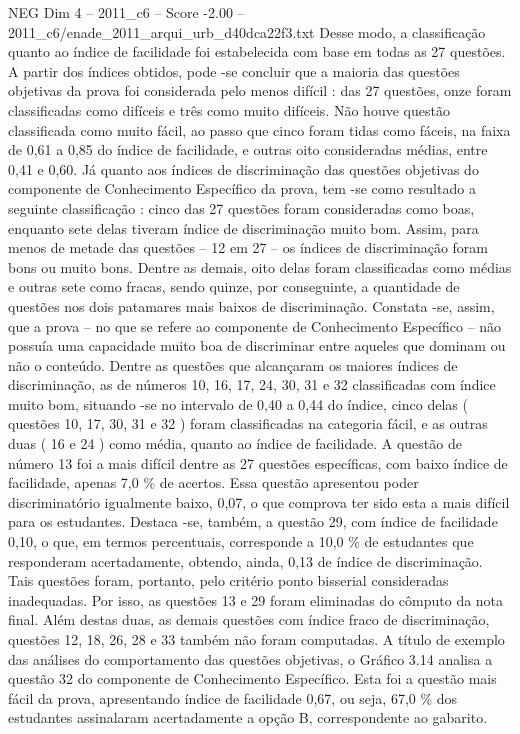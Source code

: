 \begin{textsample}{NEG Dim 4 – 2011\_c6 – Score -2.00 – 2011\_c6/enade\_2011\_arqui\_urb\_d40dca22f3.txt}
Desse modo, a classificação quanto ao índice de facilidade foi estabelecida com base em todas as 27 questões.
A partir dos índices obtidos, pode -se concluir que a maioria das questões objetivas da prova foi considerada pelo menos difícil : das 27 questões, onze foram classificadas como difíceis e três como muito difíceis.
Não houve questão classificada como muito fácil, ao passo que cinco foram tidas como fáceis, na faixa de 0,61 a 0,85 do índice de facilidade, e outras oito consideradas médias, entre 0,41 e 0,60.
Já quanto aos índices de discriminação das questões objetivas do componente de Conhecimento Específico da prova, tem -se como resultado a seguinte classificação : cinco das 27 questões foram consideradas como boas, enquanto sete delas tiveram índice de discriminação muito bom.
Assim, para menos de metade das questões – 12 em 27 – os índices de discriminação foram bons ou muito bons.
Dentre as demais, oito delas foram classificadas como médias e outras sete como fracas, sendo quinze, por conseguinte, a quantidade de questões nos dois patamares mais baixos de discriminação.
Constata -se, assim, que a prova – no que se refere ao componente de Conhecimento Específico – não possuía uma capacidade muito boa de discriminar entre aqueles que dominam ou não o conteúdo.
Dentre as questões que alcançaram os maiores índices de discriminação, as de números 10, 16, 17, 24, 30, 31 e 32 classificadas com índice muito bom, situando -se no intervalo de 0,40 a 0,44 do índice, cinco delas ( questões 10, 17, 30, 31 e 32 ) foram classificadas na categoria fácil, e as outras duas ( 16 e 24 ) como média, quanto ao índice de facilidade.
A questão de número 13 foi a mais difícil dentre as 27 questões específicas, com baixo índice de facilidade, apenas 7,0 \% de acertos.
Essa questão apresentou poder discriminatório igualmente baixo, 0,07, o que comprova ter sido esta a mais difícil para os estudantes.
Destaca -se, também, a questão 29, com índice de facilidade 0,10, o que, em termos percentuais, corresponde a 10,0 \% de estudantes que responderam acertadamente, obtendo, ainda, 0,13 de índice de discriminação.
Tais questões foram, portanto, pelo critério ponto bisserial consideradas inadequadas.
Por isso, as questões 13 e 29 foram eliminadas do cômputo da nota final.
Além destas duas, as demais questões com índice fraco de discriminação, questões 12, 18, 26, 28 e 33 também não foram computadas.
A título de exemplo das análises do comportamento das questões objetivas, o Gráfico 3.14 analisa a questão 32 do componente de Conhecimento Específico.
Esta foi a questão mais fácil da prova, apresentando índice de facilidade 0,67, ou seja, 67,0 \% dos estudantes assinalaram acertadamente a opção B, correspondente ao gabarito.

\end{textsample}
